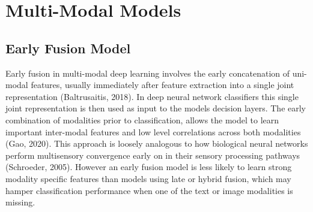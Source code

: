 \documentclass[a4paper,12pt]{article}
\begin{document}
\begin{table}[H]
	\centering
	\caption{\label{tab:table-name}Uni-Modal Page Image Classifier Performance.}
\end{table}

\section{Multi-Modal Models}

\subsection{Early Fusion Model}
Early fusion in multi-modal deep learning involves the early concatenation of uni-modal features, usually immediately after feature extraction into a single joint representation (Baltrusaitis, 2018). In deep neural network classifiers this single joint representation is then used as input to the models decision layers. The early combination of modalities prior to classification, allows the model to learn important inter-modal features and low level correlations across both modalities (Gao, 2020). This approach is loosely analogous to how biological neural networks perform multisensory convergence early on in their sensory processing pathways (Schroeder, 2005). However an early fusion model is less likely to learn strong modality specific features than models using late or hybrid fusion, which may hamper classification performance when one of the text or image modalities is missing. \\
\end{document}
